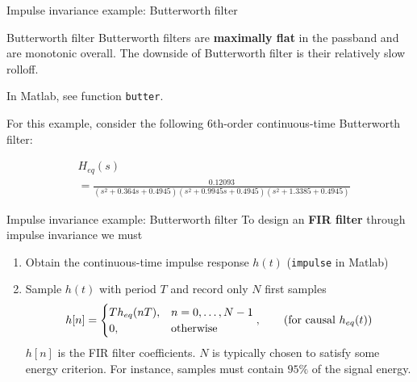 \documentclass[10pt, handout]{beamer}
\begin{document}
\begin{frame}{Impulse invariance example: Butterworth filter}
\begin{block}{Butterworth filter}
	Butterworth filters are \textbf{maximally flat} in the passband and are monotonic overall. The downside of Butterworth filter is their relatively slow rolloff.
	
	In Matlab, see function \texttt{butter}.
\end{block}

For this example, consider the following 6th-order continuous-time Butterworth filter:

\begin{align*}
&H_{eq}(s)  \\
&= \frac{0.12093}{(s^2 + 0.364s + 0.4945)(s^2 + 0.9945s + 0.4945)(s^2 + 1.3385 + 0.4945)}
\end{align*}

\end{frame}

%
\begin{frame}{Impulse invariance example: Butterworth filter}
To design an \textbf{ FIR filter} through impulse invariance we must
\begin{enumerate}
	\item Obtain the continuous-time impulse response $h(t)$ (\texttt{impulse} in Matlab)
	\item Sample $h(t)$ with period $T$ and record only $N$ first samples 
	\begin{equation*}
		h[n] = \begin{cases}
		Th_{eq}(nT), & n = 0, \ldots, N-1 \\
		0, & \text{otherwise}
		\end{cases}, \tag{for causal $h_{eq}(t)$}
	\end{equation*}
	$h[n]$ is the FIR filter coefficients. $N$ is typically chosen to satisfy some energy criterion. For instance, samples must contain $95\%$ of the signal energy.
\end{enumerate} 
\begin{center}
	\resizebox{0.7\linewidth}{!}{}
\end{center}

\end{frame}
\end{document}
